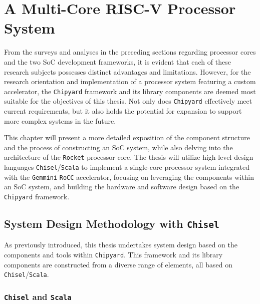 \chapter{A Multi-Core RISC-V Processor System}
\label{chap:MultiCoreRISCVSystem}

From the surveys and analyses in the preceding sections regarding processor cores and the two SoC development frameworks, it is evident that each of these research subjects possesses distinct advantages and limitations. However, for the research orientation and implementation of a processor system featuring a custom accelerator, the \texttt{Chipyard} framework and its library components are deemed most suitable for the objectives of this thesis. Not only does \texttt{Chipyard} effectively meet current requirements, but it also holds the potential for expansion to support more complex systems in the future.

This chapter will present a more detailed exposition of the component structure and the process of constructing an SoC system, while also delving into the architecture of the \texttt{Rocket} processor core. The thesis will utilize high-level design languages \texttt{Chisel}/\texttt{Scala} to implement a single-core processor system integrated with the \texttt{Gemmini} \texttt{RoCC} accelerator, focusing on leveraging the components within an SoC system, and building the hardware and software design based on the \texttt{Chipyard} framework.

\section{System Design Methodology with \texttt{Chisel}}
\label{sec:design_methodology_chisel}

As previously introduced, this thesis undertakes system design based on the components and tools within \texttt{Chipyard}. This framework and its library components are constructed from a diverse range of elements, all based on \texttt{Chisel}/\texttt{Scala}.

\subsection{\texttt{Chisel} and \texttt{Scala}}
\label{subsec:chisel_scala}

